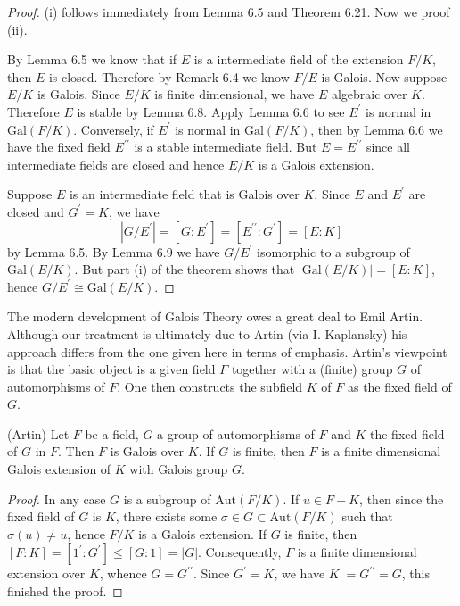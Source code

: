 \begin{proof}
(i) follows immediately from Lemma 6.5 and Theorem 6.21. Now we proof (ii).\par
By Lemma 6.5 we know that if $E$ is a intermediate field of the extension $F/K$, then $E$ is closed. Therefore by Remark 6.4 we know $F/E$ is Galois. Now suppose $E/K$ is Galois. Since $E/K$ is finite dimensional, we have $E$ algebraic over $K$. Therefore $E$ is stable by Lemma 6.8. Apply Lemma 6.6 to see $E^\prime$ is normal in $\mathrm{Gal}(F/K)$. Conversely, if $E^\prime$ is normal in $\mathrm{Gal}(F/K)$, then by Lemma 6.6 we have the fixed field $E^{\prime\prime}$ is a stable intermediate field. But $E=E^{\prime\prime}$ since all intermediate fields are closed and hence $E/K$ is a Galois extension.\par
Suppose $E$ is an intermediate field that is Galois over $K$. Since $E$ and $E^\prime$ are closed and $G^\prime=K$, we have 
$$
\left| G/E^{\prime} \right|=\left[ G:E^{\prime} \right] =\left[ E^{\prime\prime}:G^{\prime} \right] =\left[ E:K \right] 
$$
by Lemma 6.5. By Lemma 6.9 we have $G/E^\prime$ isomorphic to a subgroup of $\mathrm{Gal}(E/K)$. But part (i) of the theorem shows that $|\mathrm{Gal}(E/K)|=[E:K]$, hence $G/E^\prime\cong\mathrm{Gal}(E/K)$.
\end{proof}
The modern development of Galois Theory owes a great deal to Emil Artin. Although our treatment is ultimately due to Artin (via I. Kaplansky) his approach differs from the one given here in terms of emphasis. Artin's viewpoint is that the basic object is a given field $F$ together with a (finite) group $G$ of automorphisms of $F$. One then constructs the subfield $K$ of $F$ as the fixed field of $G$.
\begin{theorem}(Artin)
Let $F$ be a field, $G$ a group of automorphisms of $F$ and $K$ the fixed field of $G$ in $F$. Then $F$ is Galois over $K$. If $G$ is finite, then $F$ is a finite dimensional Galois extension of $K$ with Galois group $G$.
\end{theorem}
\begin{proof}
In any case $G$ is a subgroup of $\mathrm{Aut}(F/K)$. If $u\in F-K$, then since the fixed field of $G$ is $K$, there exists some $\sigma\in G\subset\mathrm{Aut}(F/K)$ such that $\sigma(u)\ne u$, hence $F/K$ is a Galois extension. If $G$ is finite, then $[F:K]=[1^\prime:G^\prime]\le[G:1]=|G|$. Consequently, $F$ is a finite dimensional extension over $K$, whence $G=G^{\prime\prime}$. Since $G^\prime=K$, we have $K^\prime=G^{\prime\prime}=G$, this finished the proof.
\end{proof}
